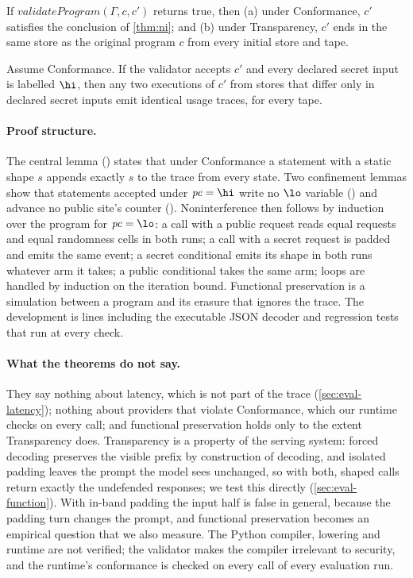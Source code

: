 \begin{theorem}
If $\mathit{validateProgram}(\Gamma, c, c')$ returns true, then (a) under Conformance, $c'$ satisfies the conclusion of \cref{thm:ni}; and (b) under Transparency, $c'$ ends in the same store as the original program $c$ from every initial store and tape.
\end{theorem}

\begin{corollary}
Assume Conformance. If the validator accepts $c'$ and every declared secret input is labelled $\hi$, then any two executions of $c'$ from stores that differ only in declared secret inputs emit identical usage traces, for every tape.
\end{corollary}

\paragraph{Proof structure.} The central lemma () states that under Conformance a statement with a static shape $s$ appends exactly $s$ to the trace from every state. Two confinement lemmas show that statements accepted under $\mathit{pc}=\hi$ write no $\lo$ variable () and advance no public site's counter (). Noninterference then follows by induction over the program for $\mathit{pc}=\lo$: a call with a public request reads equal requests and equal randomness cells in both runs; a call with a secret request is padded and emits the same event; a secret conditional emits its shape in both runs whatever arm it takes; a public conditional takes the same arm; loops are handled by induction on the iteration bound. Functional preservation is a simulation between a program and its erasure that ignores the trace. The development is \leanLines{} lines including the executable JSON decoder and  regression tests that run at every check.

\paragraph{What the theorems do not say.} They say nothing about latency, which is not part of the trace (\cref{sec:eval-latency}); nothing about providers that violate Conformance, which our runtime checks on every call; and functional preservation holds only to the extent Transparency does. Transparency is a property of the serving system: forced decoding preserves the visible prefix by construction of decoding, and isolated padding leaves the prompt the model sees unchanged, so with both, shaped calls return exactly the undefended responses; we test this directly (\cref{sec:eval-function}). With in-band padding the input half is false in general, because the padding turn changes the prompt, and functional preservation becomes an empirical question that we also measure. The Python compiler, lowering and runtime are not verified; the validator makes the compiler irrelevant to security, and the runtime's conformance is checked on every call of every evaluation run.
